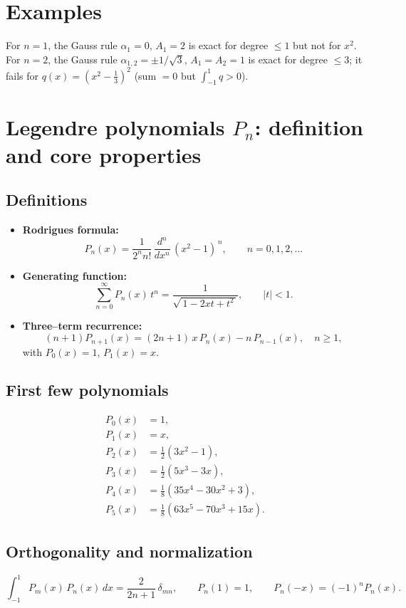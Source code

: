 \documentclass[12pt,a4paper]{article}
\theoremstyle{plain}
\theoremstyle{definition}
\theoremstyle{remark}
\theoremstyle{remark}
\begin{document}
	\bigskip
	
	\section*{Examples}
	For $n=1$, the Gauss rule $\alpha_1=0$, $A_1=2$ is exact for degree $\le1$ but not for $x^2$.
	For $n=2$, the Gauss rule $\alpha_{1,2}=\pm 1/\sqrt{3}$, $A_1=A_2=1$ is exact for degree $\le3$; it fails for
	$q(x)=(x^2-\tfrac13)^2$ (sum $=0$ but $\int_{-1}^{1}q>0$).
	
	
\section*{Legendre polynomials $P_n$: definition and core properties}

\subsection*{Definitions}
\begin{itemize}\setlength{\itemsep}{0.6em}
	\item \textbf{Rodrigues formula:}
	\[
	P_n(x)=\frac{1}{2^n n!}\,\frac{d^n}{dx^n}\,(x^2-1)^{\,n},\qquad n=0,1,2,\dots
	\]
	\item \textbf{Generating function:}
	\[
	\sum_{n=0}^\infty P_n(x)\,t^n=\frac{1}{\sqrt{\,1-2xt+t^2\,}},\qquad |t|<1.
	\]
	\item \textbf{Three–term recurrence:}
	\[
	(n+1)P_{n+1}(x)=(2n+1)\,x\,P_n(x)-n\,P_{n-1}(x),\quad n\ge1,
	\]
	with $P_0(x)=1$, $P_1(x)=x$.
\end{itemize}

\subsection*{First few polynomials}
\[
\begin{aligned}
	P_0(x)&=1,\\
	P_1(x)&=x,\\
	P_2(x)&=\tfrac{1}{2}(3x^2-1),\\
	P_3(x)&=\tfrac{1}{2}(5x^3-3x),\\
	P_4(x)&=\tfrac{1}{8}(35x^4-30x^2+3),\\
	P_5(x)&=\tfrac{1}{8}(63x^5-70x^3+15x).
\end{aligned}
\]

\subsection*{Orthogonality and normalization}
\[
\int_{-1}^{1} P_m(x)\,P_n(x)\,dx=\frac{2}{2n+1}\,\delta_{mn},\qquad
P_n(1)=1,\qquad P_n(-x)=(-1)^nP_n(x).
\]
\end{document}
